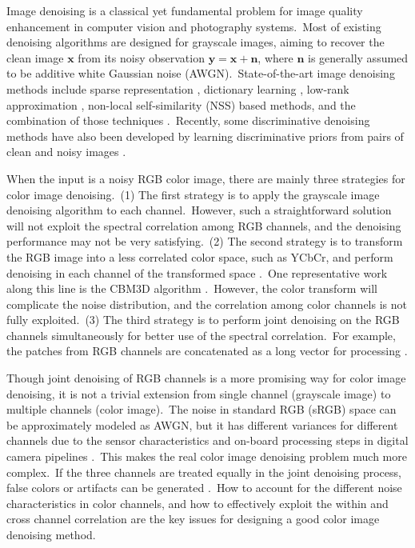 \documentclass[10pt,twocolumn,letterpaper]{article}
\begin{document}
Image denoising is a classical yet fundamental problem for image quality enhancement in computer vision and photography systems.\ Most of existing denoising algorithms are designed for grayscale images, aiming to recover the clean image $\mathbf{x}$ from its noisy observation $\mathbf{y}=\mathbf{x}+\mathbf{n}$, where $\mathbf{n}$ is generally assumed to be additive white Gaussian noise (AWGN).\ State-of-the-art image denoising methods include sparse representation \cite{bm3d}, dictionary learning \cite{ksvd}, low-rank approximation \cite{wnnm}, non-local self-similarity (NSS) \cite{nlm} based methods, and the combination of those techniques \cite{ksvd,bm3d,lssc,epll,ncsr,pgpd,wnnm}.\ Recently, some discriminative denoising methods have also been developed by learning discriminative priors from pairs of clean and noisy images \cite{mlp,csf,chen2015learning,dncnn}. 

When the input is a noisy RGB color image, there are mainly three strategies for color image denoising.\ (1) The first strategy is to apply the grayscale image denoising algorithm to each channel.\ However, such a straightforward solution will not exploit the spectral correlation among RGB channels, and the denoising performance may not be very satisfying.\ (2) The second strategy is to transform the RGB image into a less correlated color space, such as YCbCr, and perform denoising in each channel of the transformed space \cite{foe,cbm3d}.\ One representative work along this line is the CBM3D algorithm \cite{cbm3d}.\ However, the color transform will complicate the noise distribution, and the correlation among color channels is not fully exploited.\ (3) The third strategy is to perform joint denoising on the RGB channels simultaneously for better use of the spectral correlation.\ For example, the patches from RGB channels are concatenated as a long vector for processing \cite{mairal2008sparse,Zhu_2016_CVPR}. 

Though joint denoising of RGB channels is a more promising way for color image denoising, it is not a trivial extension from single channel (grayscale image) to multiple channels (color image).\ The noise in standard RGB (sRGB) space can be approximately modeled as AWGN, but it has different variances for different channels \cite{Liu2008,Leungtip,crosschannel2016} due to the sensor characteristics and on-board processing steps in digital camera pipelines \cite{crosschannel2016,karaimer_brown_ECCV_2016}.\ This makes the real color image denoising problem much more complex.\ If the three channels are treated equally in the joint denoising process, false colors or artifacts can be generated \cite{mairal2008sparse}.\ How to account for the different noise characteristics in color channels, and how to effectively exploit the within and cross channel correlation are the key issues for designing a good color image denoising method.
\end{document}
